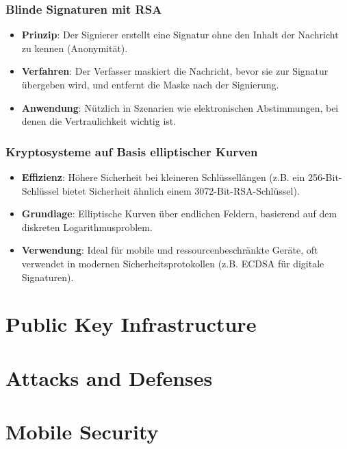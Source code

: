 \documentclass{article}
\begin{document}
\subsubsection{Blinde Signaturen mit RSA}
\begin{itemize}
  \item \textbf{Prinzip}: Der Signierer erstellt eine Signatur ohne den Inhalt der Nachricht zu kennen (Anonymität).
  \item \textbf{Verfahren}: Der Verfasser maskiert die Nachricht, bevor sie zur Signatur übergeben wird, und entfernt die Maske nach der Signierung.
  \item \textbf{Anwendung}: Nützlich in Szenarien wie elektronischen Abstimmungen, bei denen die Vertraulichkeit wichtig ist.
\end{itemize}

\subsubsection{Kryptosysteme auf Basis elliptischer Kurven}
\begin{itemize}
  \item \textbf{Effizienz}: Höhere Sicherheit bei kleineren Schlüssellängen (z.B. ein 256-Bit-Schlüssel bietet Sicherheit ähnlich einem 3072-Bit-RSA-Schlüssel).
  \item \textbf{Grundlage}: Elliptische Kurven über endlichen Feldern, basierend auf dem diskreten Logarithmusproblem.
  \item \textbf{Verwendung}: Ideal für mobile und ressourcenbeschränkte Geräte, oft verwendet in modernen Sicherheitsprotokollen (z.B. ECDSA für digitale Signaturen).
\end{itemize}



\section{Public Key Infrastructure}





\section{Attacks and Defenses}





\section{Mobile Security}

\end{document}

